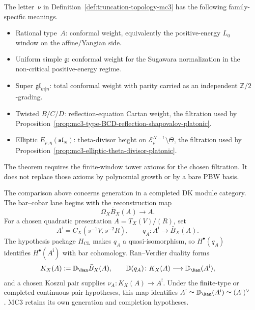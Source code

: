 \begin{remark}
\label{rem:per-family-truncation-filtrations}
%
The letter~$\nu$ in
Definition~\ref{def:truncation-topology-mc3} has the following
family-specific meanings.
\begin{itemize}[nosep]
\item Rational type~$A$: conformal weight, equivalently the
 positive-energy $L_0$ window on the affine/Yangian side.
\item Uniform simple $\mathfrak g$: conformal weight for the
 Sugawara normalization in the non-critical positive-energy regime.
\item Super $\mathfrak{gl}_{m|n}$: total conformal weight with parity
 carried as an independent $\mathbb Z/2$-grading.
\item Twisted $B/C/D$: reflection-equation Cartan weight, the
 filtration used by
 Proposition~\ref{prop:mc3-type-BCD-reflection-shapovalov-platonic}.
\item Elliptic $E_{\rho,\eta}(\mathfrak{sl}_N)$:
 theta-divisor height on
 $\mathcal E_\rho^{N-1}\setminus\Theta$, the filtration used by
 Proposition~\ref{prop:mc3-elliptic-theta-divisor-platonic}.
\end{itemize}
The theorem requires the finite-window tower axioms for the chosen
filtration.  It does not replace those axioms by polynomial growth or
by a bare PBW basis.
\end{remark}

\begin{remark}
\label{rem:bar-cobar-verdier-boundary-mc3}
%
The comparison above concerns generation in a completed DK module
category.  The bar--cobar lane begins with the reconstruction map
\[
 \Omega_X\bar B_X(A)\longrightarrow A .
\]
For a chosen quadratic presentation $A=T_X(V)/(R)$, set
\[
 A^{\mathrm i}=C_X(s^{-1}V,s^{-2}R),\qquad
 q_A\colon A^{\mathrm i}\longrightarrow\bar B_X(A).
\]
The hypothesis package $H_{\mathrm{CL}}$ makes $q_A$ a
quasi-isomorphism, so $H^\bullet(q_A)$ identifies
$H^\bullet(A^{\mathrm i})$ with bar cohomology.  Ran--Verdier duality
forms
\[
 K_X(A):=\mathbb D_{\Ran}\bar B_X(A),\qquad
 \mathbb D(q_A)\colon K_X(A)\longrightarrow
 \mathbb D_{\Ran}(A^{\mathrm i}),
\]
and a chosen Koszul pair supplies
$\nu_A\colon K_X(A)\to A^!$.  Under the finite-type or completed
continuous pair hypotheses, this map identifies
$A^!\simeq\mathbb D_{\Ran}(A^{\mathrm i})
\simeq(A^{\mathrm i})^\vee$.  MC3 retains its own generation and
completion hypotheses.
\end{remark}

